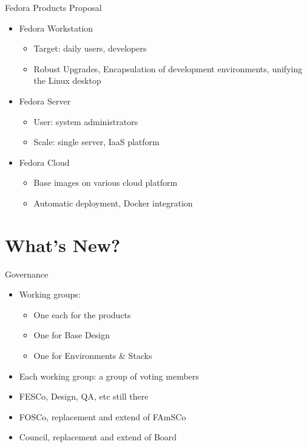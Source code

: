 \documentclass{beamer}
\begin{document}
\begin{frame}{Fedora Products Proposal}
  \begin{itemize}
    \item Fedora Workstation
      \begin{itemize}
        \item Target: daily users, developers
        \item Robust Upgrades, Encapsulation of development
          environments, unifying the Linux desktop
      \end{itemize}
    \item Fedora Server
      \begin{itemize}
        \item User: system administrators
        \item Scale: single server, IaaS platform
      \end{itemize}
    \item Fedora Cloud
      \begin{itemize}
        \item Base images on various cloud platform
        \item Automatic deployment, Docker integration
      \end{itemize}
  \end{itemize}

\end{frame}

\section{What's New?}


\begin{frame}{Governance}
  \begin{itemize}
    \item Working groups:
      \begin{itemize}
        \item One each for the products
        \item One for Base Design
        \item One for Environments \& Stacks
      \end{itemize}
    \item Each working group: a group of voting members
    \item FESCo, Design, QA, etc still there
    \item FOSCo, replacement and extend of FAmSCo
    \item Council, replacement and extend of Board
  \end{itemize}
\end{frame}
\end{document}
